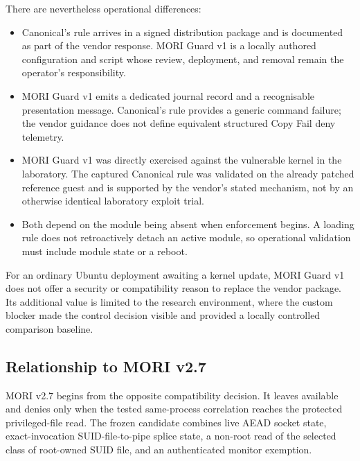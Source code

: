 There are nevertheless operational differences:

\begin{itemize}
    \item Canonical's rule arrives in a signed distribution package and is
    documented as part of the vendor response. MORI Guard v1 is a locally
    authored configuration and script whose review, deployment, and removal
    remain the operator's responsibility.

    \item MORI Guard v1 emits a dedicated journal record and a recognisable
    presentation message. Canonical's rule provides a generic command failure;
    the vendor guidance does not define equivalent structured Copy Fail deny
    telemetry.

    \item MORI Guard v1 was directly exercised against the vulnerable kernel in
    the laboratory. The captured Canonical rule was validated on the already
    patched reference guest and is supported by the vendor's stated mechanism,
    not by an otherwise identical laboratory exploit trial.

    \item Both depend on the module being absent when enforcement begins. A
    loading rule does not retroactively detach an active module, so operational
    validation must include module state or a reboot.
\end{itemize}

For an ordinary Ubuntu deployment awaiting a kernel update, MORI Guard v1 does
not offer a security or compatibility reason to replace the vendor package. Its
additional value is limited to the research environment, where the custom
blocker made the control decision visible and provided a locally controlled
comparison baseline.

\subsection{Relationship to MORI v2.7}

MORI v2.7 begins from the opposite compatibility decision. It leaves
 available and denies only when the tested same-process
correlation reaches the protected privileged-file read. The frozen candidate
combines live AEAD socket state, exact-invocation SUID-file-to-pipe splice
state, a non-root read of the selected class of root-owned SUID file, and an
authenticated monitor exemption.

